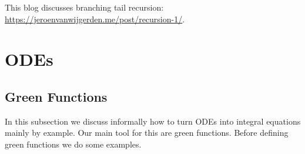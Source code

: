 \documentclass[a4paper,12pt]{article}
\begin{document}

%


\begin{related}
    This blog discusses branching tail recursion:
    \url{https://jeroenvanwijgerden.me/post/recursion-1/}.
\end{related}


\section{ODEs}

%
%


\subsection{Green Functions}
In this subsection we discuss informally how to turn ODEs into integral equations mainly
by example.
Our main tool for this are green functions. Before defining green functions
we do some examples.  \\
\end{document}
